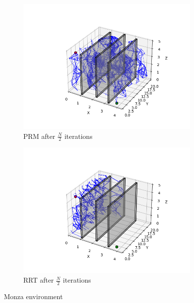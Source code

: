 \documentclass[conference]{IEEEtran}
\begin{document}
\begin{figure}[htbp]
    \centering
    \begin{subfigure}[b]{0.45\linewidth}
        \centering
        \includegraphics[width=\linewidth]{img/monza-PRM.png}
        \caption{PRM after $\frac{N}{2}$ iterations}
        \label{fig:monza-PRM}
    \end{subfigure}
    \begin{subfigure}[b]{0.45\linewidth}
        \centering
        \includegraphics[width=\linewidth]{img/monza-RRT.png}
        \caption{RRT after $\frac{N}{2}$ iterations}
        \label{fig:monza-RRT}
    \end{subfigure}
    \caption{Monza environment}
    \label{fig:monza}
\end{figure}
\end{document}
